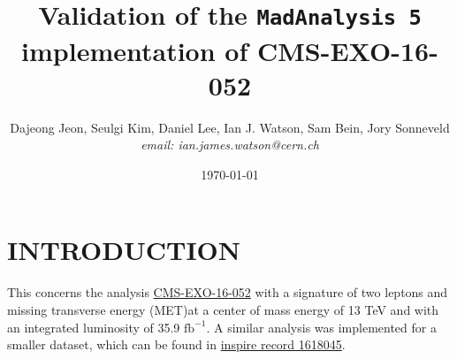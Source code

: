 \documentclass[12pt,A4paper]{article}
\title{Validation of the \texttt{MadAnalysis 5} implementation of CMS-EXO-16-052}
\author{Dajeong Jeon, Seulgi Kim, Daniel Lee, Ian J. Watson, Sam Bein, Jory Sonneveld \\
\normalsize {\it email: ian.james.watson@cern.ch}
\date{\today}
}
\newcommand{\xspace}{~}
\newcommand{\met}{\ensuremath{E_{T}^\mathrm{miss}}\xspace}
\begin{document}
        \maketitle



\section{INTRODUCTION}

This concerns the analysis \href{http://cms-results.web.cern.ch/cms-results/public-results/preliminary-results/EXO-16-052/}{CMS-EXO-16-052} with a signature of two leptons and missing transverse energy (MET)at a center of mass energy of 13 TeV and with an integrated luminosity of 35.9 $\mathrm{fb}^{−1}$.
A similar analysis was implemented for a smaller dataset, which can be found in \href{https://inspirehep.net/record/1618045/}{inspire record 1618045}.
\end{document}
